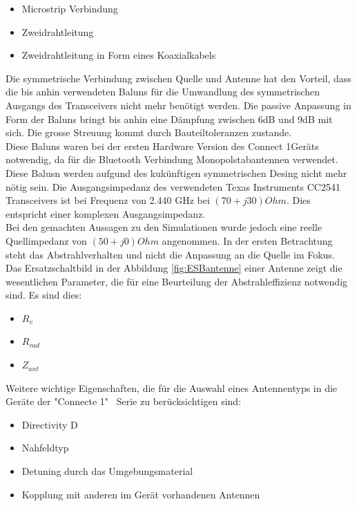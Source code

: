 \begin{itemize}
\item Microstrip Verbindung  
\item Zweidrahtleitung
\item Zweidrahtleitung in Form eines Koaxialkabels
\end{itemize}
Die symmetrische Verbindung zwischen Quelle und Antenne hat den Vorteil, dass die bis anhin verwendeten Baluns für die Umwandlung des symmetrischen Ausgangs des Transceivers nicht mehr benötigt werden. Die passive Anpassung in Form der Baluns bringt bis anhin eine Dämpfung zwischen 6dB und 9dB mit sich. Die grosse Streuung kommt durch Bauteiltoleranzen zustande.\\
Diese Baluns waren bei der ersten Hardware Version des \glqq Connect 1\grqq Geräts notwendig, da für die Bluetooth Verbindung Monopolstabantennen verwendet. Diese Balusn werden aufgund des kukünftigen symmetrischen Desing nicht mehr nötig sein. Die Ausgangsimpedanz des verwendeten Texas Instruments CC2541 Transceivers ist bei Frequenz von 2.440 GHz bei $(70+j30) Ohm$. Dies entspricht einer komplexen Ausgangsimpedanz. \\Bei den gemachten Aussagen zu den Simulationen wurde jedoch eine  reelle Quellimpedanz von $(50+j0) Ohm$ angenommen. In der ersten Betrachtung steht das Abstrahlverhalten und nicht die Anpassung  an die Quelle im Fokus. \\
Das Ersatzschaltbild in der Abbildung \ref{fig:ESBantenne} einer Antenne zeigt die wesentlichen Parameter, die für eine Beurteilung der Abstrahleffizienz notwendig sind. Es sind dies:
\begin{itemize}
\item $R_{v}$
\item $R_{rad}$
\item $Z_{ant}$
\end{itemize}
\newpage
Weitere wichtige Eigenschaften, die für die Auswahl eines Antennentyps in die Geräte der "Connecte 1" \  Serie zu berücksichtigen  sind:
\begin{itemize}
\item Directivity D
\item Nahfeldtyp
\item Detuning durch das Umgebungsmaterial
\item Kopplung mit anderen im Gerät vorhandenen Antennen
\end{itemize}


